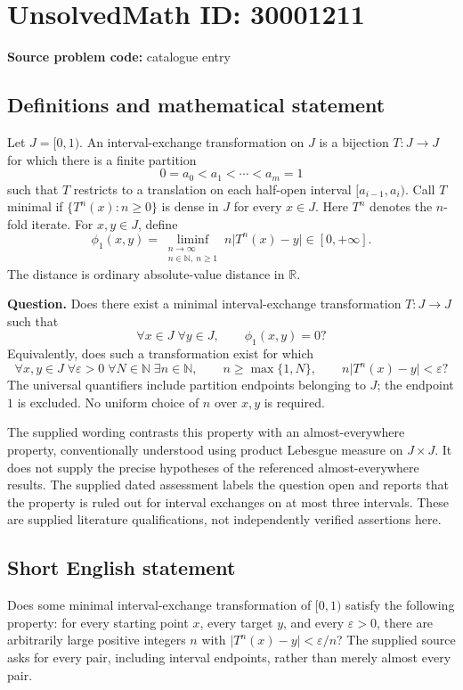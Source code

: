 \documentclass[11pt]{article}
\newcommand{\N}{\mathbb{N}}
\newcommand{\R}{\mathbb{R}}
\begin{document}
\section*{UnsolvedMath ID: 30001211}
\textbf{Source problem code:} catalogue entry
\subsection{Definitions and mathematical statement}
Let \(J=[0,1)\). An interval-exchange transformation on \(J\) is a bijection \(T:J\to J\) for which there is a finite partition
\[
0=a_0<a_1<\cdots<a_m=1
\]
such that \(T\) restricts to a translation on each half-open interval \([a_{i-1},a_i)\). Call \(T\) minimal if \(\{T^n(x):n\geq 0\}\) is dense in \(J\) for every \(x\in J\). Here \(T^n\) denotes the \(n\)-fold iterate. For \(x,y\in J\), define
\[
\phi_1(x,y)=\liminf_{\substack{n\to\infty\\ n\in\N,\ n\geq1}} n\lvert T^n(x)-y\rvert\in[0,+\infty].
\]
The distance is ordinary absolute-value distance in \(\R\).

\textbf{Question.} Does there exist a minimal interval-exchange transformation \(T:J\to J\) such that
\[
\forall x\in J\;\forall y\in J,\qquad \phi_1(x,y)=0?
\]
Equivalently, does such a transformation exist for which
\[
\forall x,y\in J\;\forall\varepsilon>0\;\forall N\in\N\;\exists n\in\N,
\qquad n\geq\max\{1,N\},\qquad n\lvert T^n(x)-y\rvert<\varepsilon?
\]
The universal quantifiers include partition endpoints belonging to \(J\); the endpoint \(1\) is excluded. No uniform choice of \(n\) over \(x,y\) is required.

The supplied wording contrasts this property with an almost-everywhere property, conventionally understood using product Lebesgue measure on \(J\times J\). It does not supply the precise hypotheses of the referenced almost-everywhere results. The supplied dated assessment labels the question open and reports that the property is ruled out for interval exchanges on at most three intervals. These are supplied literature qualifications, not independently verified assertions here.
\subsection{Short English statement}
Does some minimal interval-exchange transformation of \([0,1)\) satisfy the following property: for every starting point \(x\), every target \(y\), and every \(\varepsilon>0\), there are arbitrarily large positive integers \(n\) with \(\lvert T^n(x)-y\rvert<\varepsilon/n\)? The supplied source asks for every pair, including interval endpoints, rather than merely almost every pair.
\end{document}
